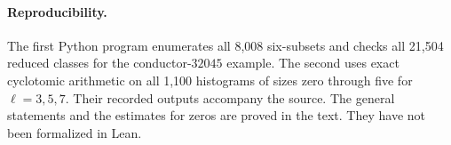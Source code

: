 \documentclass[11pt,letterpaper]{article}
\begin{document}
\paragraph{Reproducibility.}
The first Python program enumerates all 8,008 six-subsets and checks all 21,504 reduced classes for the conductor-$32045$ example. The second uses exact cyclotomic arithmetic on all 1,100 histograms of sizes zero through five for $\ell=3,5,7$. Their recorded outputs accompany the source. The general statements and the estimates for zeros are proved in the text. They have not been formalized in Lean.
\end{document}
